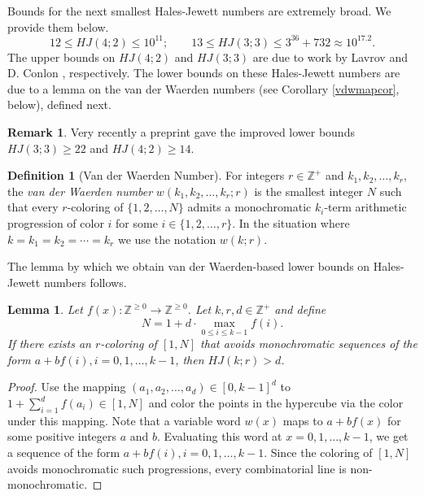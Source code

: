 \documentclass[11pt]{article}
\newtheorem{lemma}[thm]{Lemma}
\theoremstyle{definition}
\newtheorem{defn}[thm]{Definition}
\newtheorem{rem}[thm]{Remark}
\begin{document}
Bounds for the next smallest Hales-Jewett numbers are extremely broad. We provide them below. 
\[
12 \le HJ(4;2) \le 10^{11}; \qquad 13 \le HJ(3;3) \le 3^{36}+732 \approx 10^{17.2}.
\]
 The upper bounds on $HJ(4;2)$ and $HJ(3;3)$ are due to work by Lavrov \cite{Lavrov} and D. Conlon \cite{Conlon}, respectively. The lower bounds on these Hales-Jewett numbers are due to a lemma on the van der Waerden numbers (see Corollary \ref{vdwmapcor}, below), defined next. 

 \begin{rem} Very recently a preprint \cite{MH} gave the improved lower bounds $HJ(3;3) \geq 22$ and $HJ(4;2) \geq 14$.
\end{rem}
     

\begin{defn}[Van der Waerden Number]
For integers $r\in \mathbb{Z}^+$ and $k_1,k_2,\dots,k_r$, the \emph{van der Waerden number} $w(k_1,k_2,\dots,k_r;r)$ is the smallest
integer $N$ such that every $r$-coloring of $\{1,2,\dots,N\}$ admits a monochromatic $k_i$-term arithmetic progression of color $i$ for
some $i \in \{1,2,\dots,r\}$.  In the situation where
$k=k_1=k_2=\cdots=k_r$ we use the notation $w(k;r)$.
\end{defn}

The lemma by which we obtain van der Waerden-based lower bounds on Hales-Jewett numbers follows.


 

\begin{lemma}\label{genlem}
Let $f(x): \mathbb{Z}^{\geq 0} \rightarrow \mathbb{Z}^{\geq 0}$.
Let $k,r,d\in\mathbb{Z}^+$ and define
$$N = 1+d \cdot\max_{0 \leq i \leq k-1} f(i).$$ If there exists an $r$-coloring of
$[1,N]$ that avoids  monochromatic sequences of the form
$a+bf(i), i=0,1,\dots,k-1$, then $HJ(k;r)>d$.
\end{lemma}

\begin{proof}
Use the mapping $(a_1,a_2,\dots,a_d) \in [0,k-1]^d$ to $1+\sum_{i=1}^d f(a_i) \in [1,N]$ and color the points in the hypercube via the color under this mapping.
Note that a variable word $w(x)$ maps to $a+bf(x)$ for some positive integers $a$ and $b$.
Evaluating this word at $x=0,1,\dots,k-1$, we get
a sequence of the form $a+bf(i), i=0,1,\dots,k-1$.
Since the coloring of $[1,N]$ avoids monochromatic such progressions,
every combinatorial line is non-monochromatic. 
\end{proof}
\end{document}
